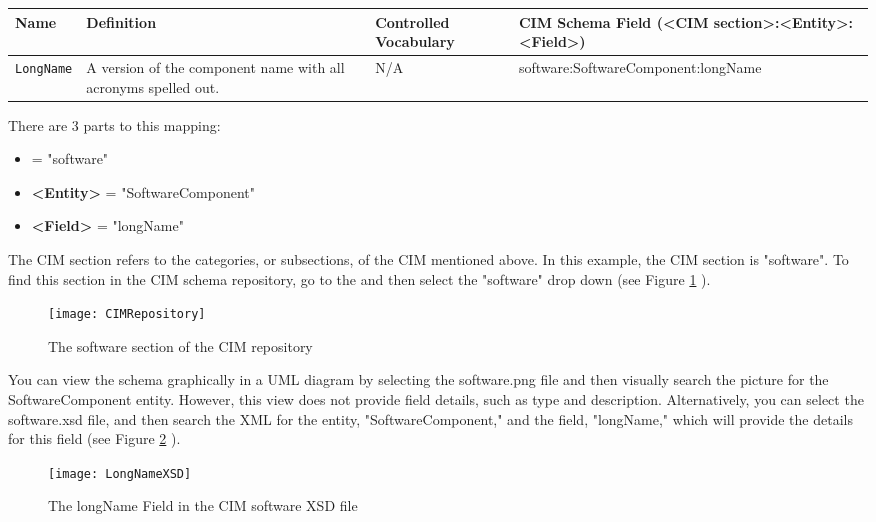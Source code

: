 \begin{tabular}{|p{2cm}|p{4cm}|p{15mm}|p{7.5cm}|}
     \hline\hline
     {\bf Name} & {\bf Definition} & {\bf Controlled Vocabulary} & {\bf CIM Schema Field \linebreak (<CIM section>:<Entity>:<Field>)}\\
     \hline\hline
     {\tt LongName} & A version of the component name with all acronyms spelled out. & N/A & software:SoftwareComponent:longName \\
     \hline\hline
\end{tabular}
\linebreak

There are 3 parts to this mapping:

\begin{itemize}
  \item {\bf <CIM section>} = "software"
  \item {\bf <Entity>} = "SoftwareComponent"
  \item {\bf <Field>} = "longName"
\end{itemize}

The CIM section refers to the categories, or subsections, of the CIM
mentioned above.  In this example, the CIM section is "software".  To find
this section in the CIM schema repository, go to the
and then select the "software" drop down (see Figure \ref{fig:CIMRepository} ).

\begin{figure}[h]
\centering
\texttt{[image: CIMRepository]}
\caption{The software section of the CIM repository}
\label{fig:CIMRepository}
\end{figure}
\clearpage

You can view the schema graphically in a UML diagram by selecting the
software.png file and then visually search the picture for the
SoftwareComponent entity.
However, this view does not provide field details, such as type and
description.  Alternatively, you can select the software.xsd file, and
then search the XML for the entity, "SoftwareComponent," and the field,
"longName," which will provide the details for this field (see Figure \ref{fig:LongNameXSD} ).

\begin{figure}[h]
\centering
\texttt{[image: LongNameXSD]}
\caption{The longName Field in the CIM software XSD file}
\label{fig:LongNameXSD}
\end{figure}
\clearpage

